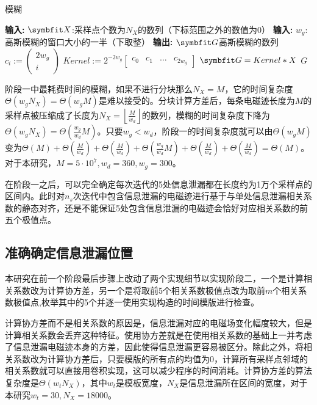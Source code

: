 {	\begin{breakablealgorithm}
		\caption{模糊}\label{alg:gaussblur}
		\begin{algorithmic}[1]
			\Statex \textbf{输入:} $\Vector X$:采样点个数为$N_X$的数列（下标范围之外的数值为0）
			\Statex \textbf{输入:} $w_g$:高斯模糊的窗口大小的一半（下取整）
			\Statex \textbf{输出:} $\Vector G$高斯模糊的数列
			\State $c_i:=\begin{pmatrix}
			2w_g\\
			i
			\end{pmatrix}$
			\EndFor
			\State $Kernel:=2^{-2w_g}\begin{bmatrix}c_0&c_1&\ldots&c_{2w_g}\end{bmatrix}$
			\State $\Vector G=Kernel*X$
			\State \Return $G$%
		\end{algorithmic}
	\end{breakablealgorithm}
	

	阶段一中最耗费时间的模糊，如果不进行分块那么$N_X=M$，它的时间复杂度$\Theta(w_gN_X)=\Theta(w_gM)$是难以接受的。分块计算方差后，每条电磁迹长度为$M$的采样点被压缩成了长度为$N_X=\left\lfloor\frac{M}{w_d}\right\rfloor$的数列，模糊的时间复杂度下降为$\Theta(w_gN_X)=\Theta(\frac{w_g}{w_d}M)$。只要$w_g<w_d$，阶段一的时间复杂度就可以由$\Theta\left( w_gM\right) $变为$\Theta(M)+\Theta\left( \frac{M}{w_d}\right) +\Theta\left( \frac{M}{w_d}\right) +\Theta\left( \frac{w_g}{w_d}M\right) +\Theta\left( \frac{M}{w_d}\right) +\Theta\left( \frac{M}{w_d}\right) =\Theta(M)$。对于本研究，$M=5\cdot10^7,w_d=360,w_g=300$。
	
	在阶段一之后，可以完全确定每次迭代的5处信息泄漏都在长度约为1万个采样点的区间内。此时对$n_s$次迭代中包含信息泄漏的电磁迹进行基于与单处信息泄漏相关系数的静态对齐，还是不能保证5处包含信息泄漏的电磁迹会恰好对应相关系数的前五个极值点。
	
	\subsection{准确确定信息泄漏位置}\label{subs:phase2}
	本研究在前一个阶段最后步骤上改动了两个实现细节以实现阶段二，一个是计算相关系数改为计算协方差，另一个是将取前5个相关系数极值点改为取前$m$个相关系数极值点,枚举其中的5个并逐一使用实现构造的时间模版进行检查。
	
	计算协方差而不是相关系数的原因是，信息泄漏对应的电磁场变化幅度较大，但是计算相关系数会丢弃这种特征。使用协方差就是在使用相关系数的基础上一并考虑了信息泄漏电磁迹本身的方差，因此使得信息泄漏更容易被区分。除此之外，将相关系数改为计算协方差后，只要模版的所有点的均值为0，计算所有采样点邻域的相关系数就可以直接用卷积实现，这可以减少程序的时间消耗。计算协方差的算法复杂度是$\Theta(w_tN_X)$，其中$w_t$是模板宽度，$N_X$是信息泄漏所在区间的宽度，对于本研究$w_t=30,N_X=18000$。
	
}
